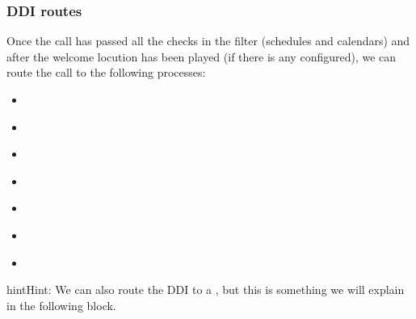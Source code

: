 \documentclass[letterpaper,10pt,english]{sphinxmanual}
\begin{document}
\subsubsection{DDI routes}
\label{administration_portal/client/vpbx/ddis:routing-logics}\label{administration_portal/client/vpbx/ddis:ddi-routes}
Once the call has passed all the checks in the filter (schedules and calendars)
and after the welcome locution has been played (if there is any configured),
we can route the call to the following processes:
\begin{itemize}
\item {} 
{\hyperref[administration_portal/client/vpbx/users:users]{}}

\item {} 
{\hyperref[administration_portal/client/vpbx/routing_endpoints/hunt_groups:huntgroups]{}}

\item {} 
{\hyperref[administration_portal/client/vpbx/routing_endpoints/ivrs:ivrs]{}}

\item {} 
{\hyperref[administration_portal/client/vpbx/routing_endpoints/conference_rooms:conference\string-rooms]{}}

\item {} 
{\hyperref[administration_portal/client/vpbx/routing_endpoints/conditional_routes:conditional\string-routes]{}}

\item {} 
{\hyperref[administration_portal/client/vpbx/routing_endpoints/queues:queues]{}}

\item {} 
{\hyperref[administration_portal/client/vpbx/routing_endpoints/friends/index:friends]{}}

\end{itemize}

\begin{notice}{hint}{Hint:}
We can also route the DDI to a {\hyperref[administration_portal/client/vpbx/faxes:faxing\string-system]{}}, but
this is something we will explain in the following block.
\end{notice}
\end{document}
